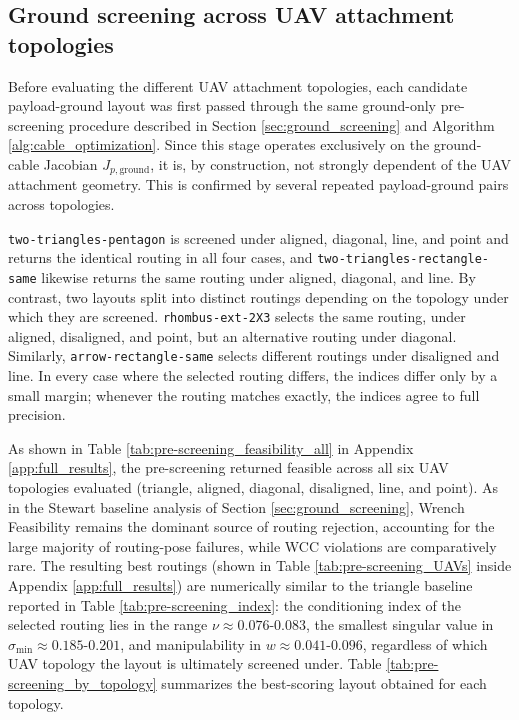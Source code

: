\subsection{Ground screening across UAV attachment topologies}
\label{sec:ground_screening_uav_topologies}

Before evaluating the different UAV attachment topologies, each candidate payload-ground layout was first passed through the same ground-only pre-screening procedure described in Section \ref{sec:ground_screening} and Algorithm \ref{alg:cable_optimization}. Since this stage operates exclusively on the ground-cable Jacobian $J_{p,\text{ground}}$, it is, by construction, not strongly dependent of the UAV attachment geometry. This is confirmed by several repeated payload-ground pairs across topologies. 

\texttt{two-triangles-pentagon} is screened under aligned, diagonal, line, and point and returns the identical routing in all four cases, and \texttt{two-triangles-rectangle-same} likewise returns the same routing under aligned, diagonal, and line. By contrast, two layouts split into distinct routings depending on the topology under which they are screened. \texttt{rhombus-ext-2X3} selects the same routing, under aligned, disaligned, and point, but an alternative routing under diagonal. Similarly, \texttt{arrow-rectangle-same} selects different routings under disaligned and line. In every case where the selected routing differs, the indices differ only by a small margin; whenever the routing matches exactly, the indices agree to full precision.

As shown in Table \ref{tab:pre-screening_feasibility_all} in Appendix \ref{app:full_results}, the pre-screening returned feasible across all six UAV topologies evaluated (triangle, aligned, diagonal, disaligned, line, and point). As in the Stewart baseline analysis of Section \ref{sec:ground_screening}, Wrench Feasibility remains the dominant source of routing rejection, accounting for the large majority of routing-pose failures, while WCC violations are comparatively rare.
The resulting best routings (shown in Table \ref{tab:pre-screening_UAVs} inside Appendix \ref{app:full_results}) are numerically similar to the triangle baseline reported in Table \ref{tab:pre-screening_index}: the conditioning index of the selected routing lies in the range $\nu \approx 0.076$-$0.083$, the smallest singular value in $\sigma_{\min} \approx 0.185$-$0.201$, and manipulability in $w \approx 0.041$-$0.096$, regardless of which UAV topology the layout is ultimately screened under. Table \ref{tab:pre-screening_by_topology} summarizes the best-scoring layout obtained for each topology.

